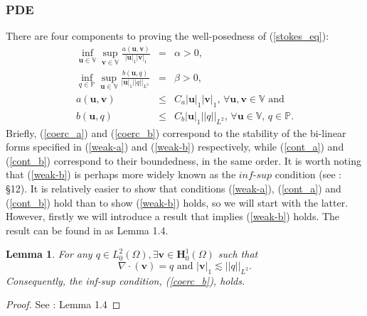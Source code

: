 \documentclass[12pt,a4paper]{article}
\newtheorem{lemma}[theorem]{Lemma}
\theoremstyle{definition}
\begin{document}
\subsubsection{PDE}\label{PDE_cont}
There are four components to proving the well-posedness of (\ref{stokes_eq}):
	 \begin{eqnarray}\label{coerc_a}
	\inf_{\textbf{u}\in \mathbb{V}}\sup_{\textbf{v}\in \mathbb{V}}\frac{a\left(\textbf{u},\textbf{v}\right)}{\left|\textbf{u}\right|_1 \left|\textbf{v}\right|_1}&=&\alpha>0,\\\label{coerc_b}
			\inf_{q\in \mathbb{P}}\sup_{\textbf{u}\in \mathbb{V}}\frac{b\left(\textbf{u},q\right)}{\left|\textbf{u}\right|_1 \left|\left|q\right|\right|_{L^2}}&=&\beta>0,\\\label{cont_a}
		a\left(\textbf{u},\textbf{v}\right)&\leq& C_a\left|\textbf{u}\right|_1\left|\textbf{v}\right|_1,\, \forall \textbf{u},\textbf{v} \in \mathbb{V}\text{ and}\\\label{cont_b}
		b\left(\textbf{u},q\right)&\leq& C_b\left|\textbf{u}\right|_1\left|\left|q\right|\right|_{L^2},\,\forall \textbf{u} \in \mathbb{V},\, q \in \mathbb{P}.
	\end{eqnarray}
Briefly, (\ref{coerc_a}) and (\ref{coerc_b}) correspond to the stability of the bi-linear forms specified in (\ref{weak-a}) and (\ref{weak-b}) respectively, while (\ref{cont_a}) and (\ref{cont_b}) correspond to their boundedness, in the same order. It is worth noting that (\ref{weak-b}) is perhaps more widely known as the $\textit{inf-sup}$ condition (see \cite{brenner2007mathematical}: \S 12). It is relatively easier to show that conditions (\ref{weak-a}), (\ref{cont_a}) and (\ref{cont_b}) hold than to show (\ref{weak-b}) holds, so we will start with the latter.  However, firstly we will introduce a result that implies (\ref{weak-b}) holds.  The result can be found in \cite{Chen2016} as Lemma 1.4.
\begin{lemma}\label{Lemma_equiv}
	For any $q\in L^2_0\left(\Omega\right), \exists \textbf{v}\in \textbf{H}^1_0\left(\Omega\right)$ such that
	\begin{equation}
		\nabla \cdot \left(\textbf{v}\right) = q \text{ and } \left|\textbf{v}\right|_1 \lesssim \left|\left|q\right|\right|_{L^2}\nonumber.
	\end{equation}
	Consequently, the inf-sup condition, (\ref{coerc_b}), holds.
\end{lemma}
\begin{proof}
	See \cite{Chen2016}: Lemma 1.4
\end{proof}
\end{document}
